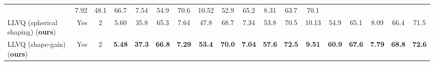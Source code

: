 \documentclass{article}
\theoremstyle{plain}
\theoremstyle{definition}
\theoremstyle{remark}
\begin{document}
\begin{table}[t]
{\begin{tabular}{l r c | c c c | c c c | c c c | c c c | c c c }
& 7.92 & 48.1 & 66.7
& 7.54 & 54.9 & 70.6
& 10.52 & 52.9 & 65.2 &
8.31 & 63.7 & 70.1 \\
LLVQ (spherical shaping) (\textbf{ours}) & Yes & 2 &
5.60 &
35.8 &
65.3 &
7.64 & 47.8 & 68.7
& 7.34 & 53.8 & 70.5
& 10.13 & 54.9 & 65.1 &
8.09 & 66.4 & 71.5 \\
LLVQ (shape-gain) (\textbf{ours}) & Yes & 2 &
\textbf{5.48} & \textbf{37.3} & \textbf{66.8} & 
\textbf{7.29} & \textbf{53.4} & \textbf{70.0} &
\textbf{7.04} & \textbf{57.6} & \textbf{72.5} &
\textbf{9.51} & \textbf{60.9} & \textbf{67.6} &
\textbf{7.79} & \textbf{68.8} & \textbf{72.6} \\
\hline
\end{tabular}
}
\vspace{-0.3em}
\end{table}


\end{document}
